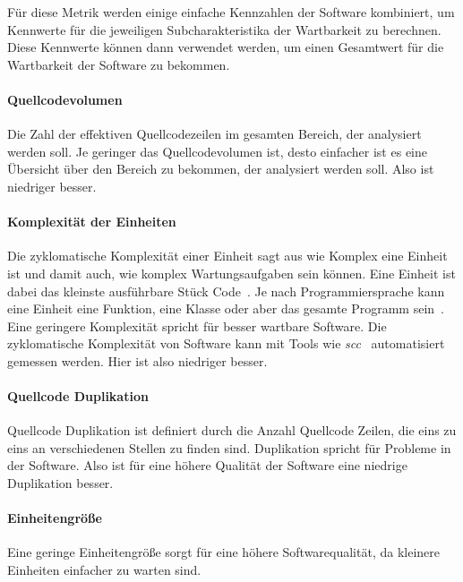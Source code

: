 \documentclass[12pt, a4paper, ngerman]{article}
\begin{document}
Für diese Metrik werden einige einfache Kennzahlen der Software kombiniert,
um Kennwerte für die jeweiligen Subcharakteristika der Wartbarkeit zu berechnen.
Diese Kennwerte können dann verwendet werden, um einen Gesamtwert
für die Wartbarkeit der Software zu bekommen.

\paragraph{Quellcodevolumen}

Die Zahl der effektiven Quellcodezeilen im gesamten Bereich, der analysiert werden soll.
Je geringer das Quellcodevolumen ist,
desto einfacher ist es eine Übersicht über den Bereich zu bekommen,
der analysiert werden soll.
Also ist niedriger besser.

\paragraph{Komplexität der Einheiten}

Die zyklomatische Komplexität einer Einheit sagt aus wie Komplex eine Einheit ist
und damit auch, wie komplex Wartungsaufgaben sein können.
Eine Einheit ist dabei das kleinste ausführbare Stück Code~\cite{maintainability_metrics}.
Je nach Programmiersprache kann eine Einheit eine Funktion, eine Klasse oder aber das gesamte Programm sein~\cite{maintainability_metrics}.
Eine geringere Komplexität spricht für besser wartbare Software.
Die zyklomatische Komplexität von Software kann mit Tools
wie \emph{scc}~\cite{scc} automatisiert gemessen werden.
Hier ist also niedriger besser.

\paragraph{Quellcode Duplikation}

Quellcode Duplikation ist definiert durch die Anzahl Quellcode Zeilen,
die eins zu eins an verschiedenen Stellen zu finden sind.
Duplikation spricht für Probleme in der Software.
Also ist für eine höhere Qualität der Software eine niedrige Duplikation besser.

\paragraph{Einheitengröße}

Eine geringe Einheitengröße sorgt für eine höhere Softwarequalität,
da kleinere Einheiten einfacher zu warten sind.
\end{document}
